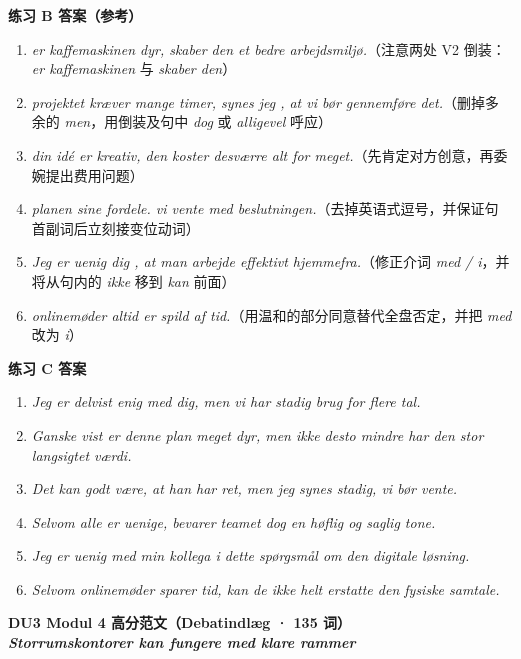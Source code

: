 \begin{answerbox}
\textbf{练习 B 答案（参考）}
\begin{enumerate}
  \item \textit{ er kaffemaskinen dyr,  skaber den et bedre arbejdsmiljø.}（注意两处 V2 倒装：\textit{er kaffemaskinen} 与 \textit{skaber den}）
  \item \textit{ projektet kræver mange timer, synes jeg , at vi bør gennemføre det.}（删掉多余的 \textit{men}，用倒装及句中 \textit{dog} 或 \textit{alligevel} 呼应）
  \item \textit{ din idé er kreativ,  den koster desværre alt for meget.}（先肯定对方创意，再委婉提出费用问题）
  \item \textit{ planen sine fordele.  vi vente med beslutningen.}（去掉英语式逗号，并保证句首副词后立刻接变位动词）
  \item \textit{Jeg er uenig  dig , at man  arbejde effektivt hjemmefra.}（修正介词 \textit{med / i}，并将从句内的 \textit{ikke} 移到 \textit{kan} 前面）
  \item \textit{ onlinemøder altid er spild af tid.}（用温和的部分同意替代全盘否定，并把 \textit{med} 改为 \textit{i}）
\end{enumerate}

\textbf{练习 C 答案}
\begin{enumerate}
  \item \textit{Jeg er delvist enig med dig, men vi har stadig brug for flere tal.}
  \item \textit{Ganske vist er denne plan meget dyr, men ikke desto mindre har den stor langsigtet værdi.}
  \item \textit{Det kan godt være, at han har ret, men jeg synes stadig, vi bør vente.}
  \item \textit{Selvom alle er uenige, bevarer teamet dog en høflig og saglig tone.}
  \item \textit{Jeg er uenig med min kollega i dette spørgsmål om den digitale løsning.}
  \item \textit{Selvom onlinemøder sparer tid, kan de ikke helt erstatte den fysiske samtale.}
\end{enumerate}

\textbf{DU3 Modul 4 高分范文（Debatindlæg · 135 词）}\\
\textit{\textbf{Storrumskontorer kan fungere med klare rammer}}


\end{answerbox}
